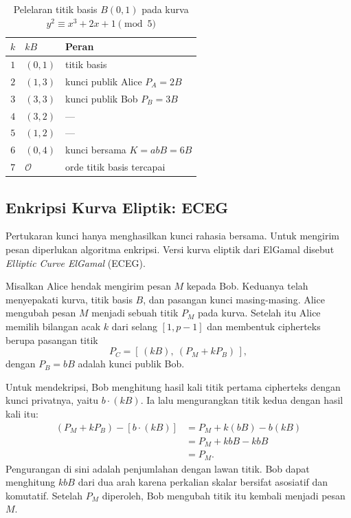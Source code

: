 \begin{table}[htbp]
    \centering
    \caption{Pelelaran titik basis $B(0,1)$ pada kurva
    $y^2 \equiv x^3 + 2x + 1 \pmod{5}$}
    \label{tab:ecdh-gf5}
    \begin{tabularx}{\linewidth}{@{}c l
                                   >{\raggedright\arraybackslash}X@{}}
    \toprule
    $k$ & $kB$ & \textbf{Peran} \\
    \midrule
    $1$ & $(0, 1)$ & titik basis \\
    \addlinespace
    $2$ & $(1, 3)$ & kunci publik Alice $P_A = 2B$ \\
    \addlinespace
    $3$ & $(3, 3)$ & kunci publik Bob $P_B = 3B$ \\
    \addlinespace
    $4$ & $(3, 2)$ & --- \\
    \addlinespace
    $5$ & $(1, 2)$ & --- \\
    \addlinespace
    $6$ & $(0, 4)$ & kunci bersama $K = abB = 6B$ \\
    \addlinespace
    $7$ & $\mathcal{O}$ & orde titik basis tercapai \\
    \bottomrule
    \end{tabularx}
\end{table}

\subsection{Enkripsi Kurva Eliptik: ECEG}
\label{subsec:eceg}

Pertukaran kunci hanya menghasilkan kunci rahasia bersama. Untuk mengirim pesan
diperlukan algoritma enkripsi. Versi kurva eliptik dari ElGamal disebut
\textit{Elliptic Curve ElGamal} (ECEG).

Misalkan Alice hendak mengirim pesan $M$ kepada Bob. Keduanya telah menyepakati
kurva, titik basis $B$, dan pasangan kunci masing-masing. Alice mengubah pesan
$M$ menjadi sebuah titik $P_M$ pada kurva. Setelah itu Alice memilih bilangan
acak $k$ dari selang $[1, p-1]$ dan membentuk cipherteks berupa pasangan titik
\begin{equation}
P_C = \left[\, (kB),\ (P_M + kP_B) \,\right] ,
\label{eq:eceg-cipher}
\end{equation}
dengan $P_B = bB$ adalah kunci publik Bob.

Untuk mendekripsi, Bob menghitung hasil kali titik pertama cipherteks dengan
kunci privatnya, yaitu $b \cdot (kB)$. Ia lalu mengurangkan titik kedua dengan
hasil kali itu:
\begin{equation}
\begin{split}
(P_M + kP_B) - \left[ b \cdot (kB) \right]
  &= P_M + k(bB) - b(kB) \\
  &= P_M + kbB - kbB \\
  &= P_M .
\end{split}
\label{eq:eceg-dekripsi}
\end{equation}
Pengurangan di sini adalah penjumlahan dengan lawan titik. Bob dapat menghitung
$kbB$ dari dua arah karena perkalian skalar bersifat asosiatif dan komutatif.
Setelah $P_M$ diperoleh, Bob mengubah titik itu kembali menjadi pesan $M$.

